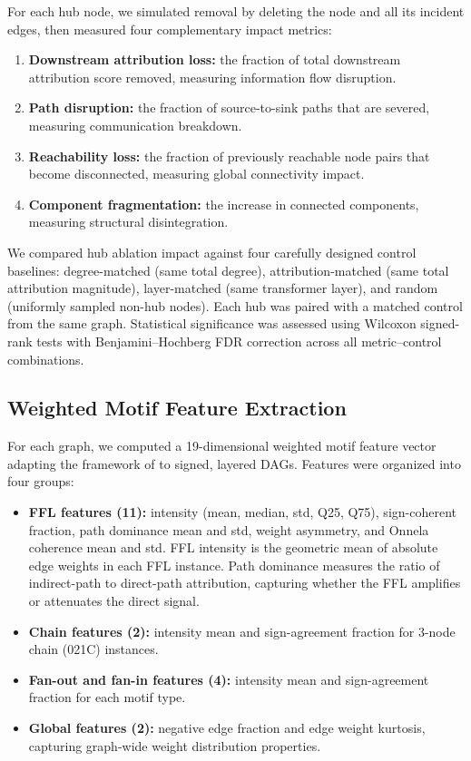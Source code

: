 For each hub node, we simulated removal by deleting the node and all its incident edges, then measured four complementary impact metrics:
\begin{enumerate}
\item \textbf{Downstream attribution loss:} the fraction of total downstream attribution score removed, measuring information flow disruption.
\item \textbf{Path disruption:} the fraction of source-to-sink paths that are severed, measuring communication breakdown.
\item \textbf{Reachability loss:} the fraction of previously reachable node pairs that become disconnected, measuring global connectivity impact.
\item \textbf{Component fragmentation:} the increase in connected components, measuring structural disintegration.
\end{enumerate}
We compared hub ablation impact against four carefully designed control baselines: degree-matched (same total degree), attribution-matched (same total attribution magnitude), layer-matched (same transformer layer), and random (uniformly sampled non-hub nodes). Each hub was paired with a matched control from the same graph. Statistical significance was assessed using Wilcoxon signed-rank tests with Benjamini--Hochberg FDR correction across all metric--control combinations.

\subsection{Weighted Motif Feature Extraction}\label{sec:features}
For each graph, we computed a 19-dimensional weighted motif feature vector adapting the framework of \citet{onnela2005intensity} to signed, layered DAGs. Features were organized into four groups:
\begin{itemize}
\item \textbf{FFL features (11):} intensity (mean, median, std, Q25, Q75), sign-coherent fraction, path dominance mean and std, weight asymmetry, and Onnela coherence mean and std. FFL intensity is the geometric mean of absolute edge weights in each FFL instance. Path dominance measures the ratio of indirect-path to direct-path attribution, capturing whether the FFL amplifies or attenuates the direct signal.
\item \textbf{Chain features (2):} intensity mean and sign-agreement fraction for 3-node chain (021C) instances.
\item \textbf{Fan-out and fan-in features (4):} intensity mean and sign-agreement fraction for each motif type.
\item \textbf{Global features (2):} negative edge fraction and edge weight kurtosis, capturing graph-wide weight distribution properties.
\end{itemize}


